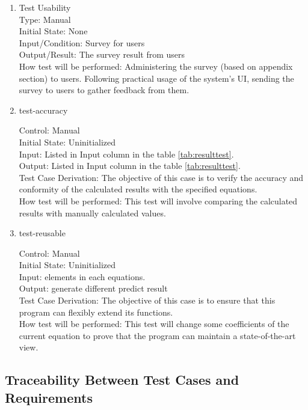 \documentclass[12pt, titlepage]{article}
\begin{document}
\begin{enumerate}

\item Test Usability \\
Type: Manual \\
Initial State: None \\
Input/Condition: Survey for users \\
Output/Result: The survey result from users \\
How test will be performed: Administering the survey (based on appendix section) to users. Following practical usage of the system's UI, sending the survey to users to gather feedback from them.

\item{test-accuracy\\}

    Control: Manual	\\				
    Initial State: Uninitialized\\		
    Input: Listed in Input column in the table \ref{tab:resulttest}.\\			
    Output: Listed in Input column in the table \ref{tab:resulttest}.\\
    Test Case Derivation: The objective of this case is to verify the accuracy and conformity of the calculated results with the specified equations.\\
    How test will be performed: This test will involve comparing the calculated results with manually calculated values.\\

\item{test-reusable\\}

    Control: Manual	\\				
    Initial State: Uninitialized\\		
    Input: elements in each equations.\\			
    Output: generate different predict result\\
    Test Case Derivation: The objective of this case is to ensure that this program can flexibly extend its functions.\\
    How test will be performed: This test will change some coefficients of the current equation to prove that the program can maintain a state-of-the-art view.\\
\end{enumerate}

\subsection{Traceability Between Test Cases and Requirements}
\end{document}
